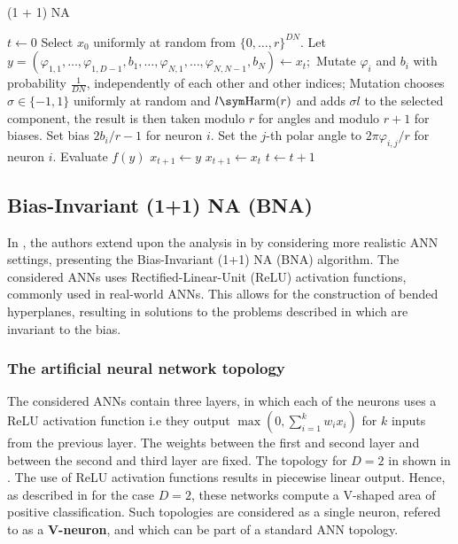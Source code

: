 \begin{algorithm}
\caption{(1 + 1) NA}
\label{alg:na}
\begin{algorithmic}
    \State $t \gets 0$
    \State Select $x_0$ uniformly at random from $\{0, \ldots, r\}^{DN}$.
        \State Let $y = (\varphi_{1,1}, \ldots, \varphi_{1,D-1}, b_1, \ldots, \varphi_{N,1}, \ldots, \varphi_{N,N-1}, b_N) \gets x_t;$
            \State Mutate $\varphi_i$ and $b_i$ with probability $\frac{1}{DN}$, independently of each other and other indices;
            \State Mutation chooses $\sigma \in \{-1, 1\}$ uniformly at random and $l \sym \text{Harm}(r)$ and adds $\sigma l$ to the selected component, the
            result is then taken modulo $r$ for angles and modulo $r + 1$ for biases.
                \State Set bias $2b_i / r - 1$ for neuron $i$.
                    \State Set the $j$-th polar angle to $2\pi \varphi_{i,j} / r$ for neuron $i$.
                \EndFor
            \EndFor
            \State Evaluate $f(y)$
                \State $x_{t+1} \gets y$
            \Else
                \State $x_{t+1} \gets x_t$
            \EndIf
        \EndFor
        \State $t \gets t + 1$
    \EndWhile
\end{algorithmic}
\end{algorithm}

\subsection{Bias-Invariant (1+1) NA (BNA)}

In \cite{bna}, the authors extend upon the analysis in \cite{na} by considering more realistic ANN settings, presenting the Bias-Invariant (1+1) NA (BNA) algorithm.
The considered ANNs uses Rectified-Linear-Unit (ReLU) activation functions, commonly used in real-world ANNs.
This allows for the construction of bended hyperplanes, resulting in solutions to the problems described in  which are invariant
to the bias.

\subsubsection{The artificial neural network topology}

The considered ANNs contain three layers, in which each of the neurons uses a ReLU activation function i.e they output $\max(0, \sum_{i=1}^k w_i x_i)$ for
$k$ inputs from the previous layer.
The weights between the first and second layer and between the second and third layer are fixed. The topology for $D = 2$ in shown in .
The use of ReLU activation functions results in piecewise linear output. Hence, as described in  for the case $D = 2$, these networks compute a
V-shaped area of positive classification. Such topologies are considered as a single neuron, refered to as a \textbf{V-neuron}, and which can be part of a
standard ANN topology.

